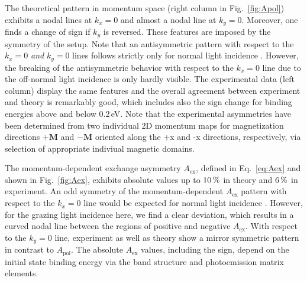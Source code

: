 \documentclass[prl,twocolumn,floatfix,superscriptaddress]{revtex4-2}
\renewcommand{\vec}[1]{\boldsymbol{#1}}
\begin{document}
The theoretical pattern in momentum space (right column in Fig.~\ref{fig:Apol}) exhibits a nodal lines at $k_{x} = 0$ and almost a nodal line at $k_{y} = 0$. Moreover, one finds a change of sign if $k_{y}$ is reversed. These features are imposed by the symmetry of the setup. Note that an antisymmetric pattern with respect to the $k_{x} = 0$ \textit{and} $k_{y} = 0$ lines follows strictly only for normal light incidence \cite{schumann2024}. However, the breaking of the antisymmetric behavior with respect to the $k_{x} = 0$ line due to the off-normal light incidence is only hardly visible. The experimental data (left column) display the same features and the overall agreement between experiment and theory is remarkably good, which includes also the sign change for binding energies above and below 0.2\,eV.
Note that the experimental asymmetries have been determined from two individual 2D momentum maps for magnetization directions $+\vec{M}$ and $-\vec{M}$ oriented along the +x and -x directions, respectively, via selection of appropriate indiviual magnetic domains.

The momentum-dependent exchange asymmetry $A_{\mathrm{ex}}$, defined in Eq.~\eqref{eq:Aex} and shown in Fig.~\ref{fig:Aex}, exhibits absolute values up to $\unit[10]{\%}$ in theory and $\unit[6]{\%}$ in experiment. An odd symmetry of the momentum-dependent $A_{\mathrm{ex}}$ pattern with respect to the $k_{x} = 0$ line would be expected for normal light incidence \cite{schumann2024}. However, for the grazing light incidence here, we find a clear deviation, which results in a curved nodal line between the regions of positive and negative $A_{\mathrm{ex}}$. With respect to the $k_{y} = 0$ line, experiment as well as theory show a mirror symmetric pattern in contrast to $A_{\mathrm{pol}}$. The absolute $A_{\mathrm{ex}}$ values, including the sign, depend on the initial state binding energy via the band structure and photoemission matrix elements.
\end{document}

